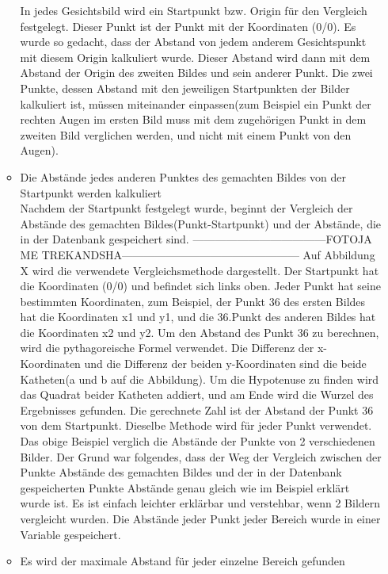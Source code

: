 \begin{enumerate}
\begin{itemize}
	In jedes Gesichtsbild wird ein Startpunkt bzw. Origin für den Vergleich festgelegt. Dieser Punkt ist der Punkt mit der Koordinaten (0/0). Es wurde so gedacht, dass der Abstand von jedem anderem Gesichtspunkt mit diesem Origin kalkuliert wurde. Dieser Abstand wird dann mit dem Abstand der Origin des zweiten Bildes und sein anderer Punkt. Die zwei Punkte, dessen Abstand mit den jeweiligen Startpunkten der Bilder kalkuliert ist, müssen miteinander einpassen(zum Beispiel ein Punkt der rechten Augen im ersten Bild muss mit dem zugehörigen Punkt in dem zweiten Bild verglichen werden, und nicht mit einem Punkt von den Augen).
	\item Die Abstände jedes anderen Punktes des gemachten Bildes von der Startpunkt werden kalkuliert \\
	Nachdem der Startpunkt festgelegt wurde, beginnt der Vergleich der Abstände des gemachten Bildes(Punkt-Startpunkt) und der Abstände, die in der Datenbank gespeichert sind.
	------------------------------------FOTOJA ME TREKANDSHA------------------------------------------------
	Auf Abbildung X wird die verwendete Vergleichsmethode dargestellt. Der Startpunkt hat die Koordinaten (0/0) und befindet sich links oben. Jeder Punkt hat seine bestimmten Koordinaten, zum Beispiel, der Punkt 36 des ersten Bildes hat die Koordinaten x1 und y1, und die 36.Punkt des anderen Bildes hat die Koordinaten x2 und y2. Um den Abstand des Punkt 36 zu berechnen, wird die pythagoreische Formel verwendet. Die Differenz der x-Koordinaten und die Differenz der beiden y-Koordinaten sind die beide Katheten(a und b auf die Abbildung). Um die Hypotenuse zu finden wird das Quadrat beider Katheten addiert, und am Ende wird die Wurzel des Ergebnisses gefunden. Die gerechnete Zahl ist der Abstand der Punkt 36 von dem Startpunkt. Dieselbe Methode wird für jeder Punkt verwendet.
	Das obige Beispiel verglich die Abstände der Punkte von 2 verschiedenen Bilder. Der Grund war folgendes, dass der Weg der Vergleich zwischen der Punkte Abstände des gemachten Bildes und der in der Datenbank gespeicherten Punkte Abstände genau gleich wie im Beispiel erklärt wurde ist. Es ist einfach leichter erklärbar und verstehbar, wenn 2 Bildern vergleicht wurden. 
	Die Abstände jeder Punkt jeder Bereich wurde in einer Variable gespeichert.
	
	\item Es wird der maximale Abstand für jeder einzelne Bereich gefunden \\
	

\end{itemize}
\end{enumerate}

